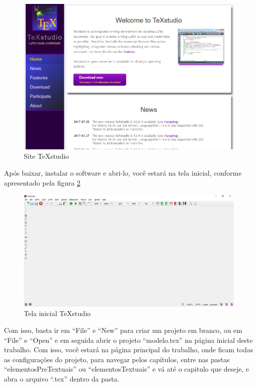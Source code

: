 \begin{figure}[htb]
	\caption{Site TeXstudio \label{fig_Cap1_siteTeXstudio}}
	\begin{center}
		\includegraphics[scale=0.4]{./Imagens/Capitulo_1/siteTeXstudio.png}
	\end{center}
\end{figure}

Após baixar, instalar o software e abri-lo, você estará na tela inicial, conforme apresentado pela figura \ref{fig_Cap1_TeXstudio}

\begin{figure}[htb]
	\caption{Tela inicial TeXstudio\label{fig_Cap1_TeXstudio}}
	\begin{center}
		\includegraphics[scale=0.4]{./Imagens/Capitulo_1/TeXstudio.png}
	\end{center}
\end{figure}
\newpage
Com isso, basta ir em ``File'' e ``New'' para criar um projeto em branco, ou em ``File'' e ``Open'' e em seguida abrir o projeto ``modelo.tex'' na página inicial deste trabalho. Com isso, você estará na página principal do trabalho, onde ficam todas as configurações do projeto, para navegar pelos capítulos, entre nas pastas ``elementosPreTextuais'' ou ``elementosTextuais'' e vá até o capitulo que deseje, e abra o arquivo ``.tex'' dentro da pasta. 

